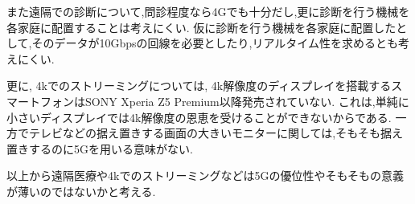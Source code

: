 また遠隔での診断について,問診程度なら4Gでも十分だし,更に診断を行う機械を各家庭に配置することは考えにくい.
仮に診断を行う機械を各家庭に配置したとして,そのデータが10Gbpsの回線を必要としたり,リアルタイム性を求めるとも考えにくい.

更に, 4kでのストリーミングについては,
4k解像度のディスプレイを搭載するスマートフォンはSONY Xperia Z5 Premium以降発売されていない.
これは,単純に小さいディスプレイでは4k解像度の恩恵を受けることができないからである.
一方でテレビなどの据え置きする画面の大きいモニターに関しては,そもそも据え置きするのに5Gを用いる意味がない.

以上から遠隔医療や4kでのストリーミングなどは5Gの優位性やそもそもの意義が薄いのではないかと考える.